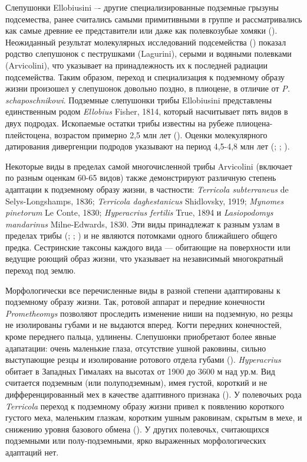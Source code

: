 Слепушонки Ellobiusini –- другие специализированные подземные грызуны подсемества, ранее считались самыми примитивными в группе и рассматривались как самые древние ее представители или даже как полевкозубые хомяки (\cite{Gromov1977}). Неожиданный результат молекулярных исследований подсемейства (\cite{Abramson2009}) показал родство слепушонок с пеструшками (Lagurini), серыми и водяными полевками (Arvicolini), что указывает на принадлежность их к последней радиации подсемейства. Таким образом, переход и специализация к подземному образу жизни произошел у слепушонок довольно поздно, в плиоцене, в отличие от \textit{P. schaposchnikowi}. Подземные слепушонки трибы Ellobiusini представлены единственным родом \textit{Ellobius} Fisher, 1814, который насчитывает пять видов в двух подродах. Ископаемые остатки трибы известны на рубеже плиоцена-плейстоцена, возрастом примерно 2,5 млн лет (\cite{Lychev1974}). Оценки молекулярного датирования дивергенции подродов указывают на период 4,5-4,8 млн лет (\cite{Abramson2009}; \cite{Lebedev2020}; \cite{Abramson2021}). 

Некоторые виды в пределах самой многочисленной трибы Arvicolini (включает по разным оценкам 60-65 видов) также демонстрируют различную степень адаптации к подземному образу жизни, в частности: \textit{Terricola subterraneus} de Selys-Longshamps, 1836; \textit{Terricola daghestanicus} Shidlovsky, 1919; \textit{Mynomes pinetorum} Le Conte, 1830; \textit{Hyperacrius fertilis} True, 1894 и \textit{Lasiopodomys mandarinus} Milne-Edwards, 1830. Эти виды принадлежат к разным узлам в пределах трибы (\cite{Abramson2009}; \cite{Martinkova2012}; \cite{Abramson2021}) и не являются потомками одного ближайшего общего предка. Сестринские таксоны каждого вида — обитающие на поверхности или ведущие роющий образ жизни, что указывает на независимый многократный переход под землю. 

Морфологически все перечисленные виды в разной степени адаптированы к подземному образу жизни. Так, ротовой аппарат и передние конечности \textit{Prometheomys} позволяют проследить изменение ниши на подземную, но резцы не изолированы губами и не выдаются вперед. Когти передних конечностей, кроме переднего пальца, удлинены. Слепушонки приобретают более явные адапатации: очень маленькие глаза, отсутствие ушной раковины, сильно выступающие резцы и изолирование ротового отдела губами (\cite{Gromov1977}). \textit{Hyperacrius} обитает в Западных Гималаях на высотах от 1900 до 3600 м над ур.м. Вид считается подземным (или полуподземным), имея густой, короткий и не дифференцированный мех в качестве адаптивного признака (\cite{Gromov1977}). У полевочьих рода \textit{Terricola} переход к подземному образу жизни привел к появлению короткого густого меха, маленьким глазкам, коротким ушным раковинам, скрытым в мехе, и снижению уровня базового обмена (\cite{Gromov1977}). У других полевочьх, считающихся подземными или полу-подземными, ярко выраженных морфологических адаптаций нет.  

